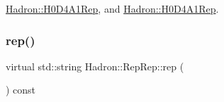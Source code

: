 \mbox{\hyperlink{structHadron_1_1H0D4A1Rep_ac5a45aa7f7cdc3ab70b8c164b2e1dce0}{Hadron\+::\+H0\+D4\+A1\+Rep}}, and \mbox{\hyperlink{structHadron_1_1H0D4A1Rep_ac5a45aa7f7cdc3ab70b8c164b2e1dce0}{Hadron\+::\+H0\+D4\+A1\+Rep}}.

\mbox{\label{structHadron_1_1RepRep_ab3213025f6de249f7095892109575fde}} 
\subsubsection{\texorpdfstring{rep()}{rep()}\hspace{0.1cm}{\footnotesize\ttfamily [1/2]}}
{\footnotesize\ttfamily virtual std\+::string Hadron\+::\+Rep\+Rep\+::rep (\begin{DoxyParamCaption}{ }\end{DoxyParamCaption}) const\hspace{0.3cm}{\ttfamily [pure virtual]}}



